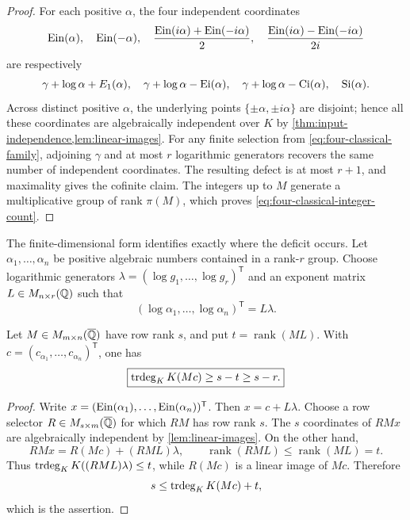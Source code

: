 \begin{proof}
For each positive \(\alpha\), the four independent coordinates
\[
 \operatorname{Ein}(\alpha),\quad \operatorname{Ein}(-\alpha),\quad
 \frac{\operatorname{Ein}(i\alpha)+\operatorname{Ein}(-i\alpha)}2,\quad
 \frac{\operatorname{Ein}(i\alpha)-\operatorname{Ein}(-i\alpha)}{2i}
\]
are respectively
\[
 \gamma+\log\alpha+E_1(\alpha),\quad
 \gamma+\log\alpha-\operatorname{Ei}(\alpha),\quad
 \gamma+\log\alpha-\operatorname{Ci}(\alpha),\quad
 \operatorname{Si}(\alpha).
\]
Across distinct positive \(\alpha\), the underlying points
\(\{\pm\alpha,\pm i\alpha\}\) are disjoint; hence all these coordinates
are algebraically independent over \(K\) by
\cref{thm:input-independence,lem:linear-images}.  For any finite selection
from \eqref{eq:four-classical-family}, adjoining \(\gamma\) and at most
\(r\) logarithmic generators recovers the same number of independent
coordinates.  The resulting defect is at most \(r+1\), and maximality gives
the cofinite claim.  The integers up to \(M\) generate a multiplicative
group of rank \(\pi(M)\), which proves
\eqref{eq:four-classical-integer-count}.
\end{proof}

The finite-dimensional form identifies exactly where the deficit occurs.
Let \(\alpha_1,\ldots,\alpha_n\) be positive algebraic numbers contained in
a rank-\(r\) group.  Choose logarithmic generators
\(\lambda=(\log g_1,\ldots,\log g_r)^{\mathsf T}\) and an exponent matrix
\(L\in M_{n\times r}(\mathbb Q)\) such that
\begin{equation}\label{eq:log-exponent-matrix}
 (\log\alpha_1,\ldots,\log\alpha_n)^{\mathsf T}=L\lambda.
\end{equation}

\begin{theorem}
\label{thm:linear-rank-deficit}
Let \(M\in M_{m\times n}(\overline{\mathbb Q})\) have row rank \(s\), and put
\(t=\operatorname{rank}(ML)\).  With
\(c=(c_{\alpha_1},\ldots,c_{\alpha_n})^{\mathsf T}\), one has
\begin{equation}\label{eq:linear-rank-deficit}
 \boxed{\displaystyle
 \operatorname{trdeg}_KK(Mc)\ge s-t\ge s-r.}
\end{equation}
\end{theorem}

\begin{proof}
Write \(x=(\operatorname{Ein}(\alpha_1),\ldots,\operatorname{Ein}(\alpha_n))^{\mathsf T}\).  Then
\(x=c+L\lambda\).  Choose a row selector
\(R\in M_{s\times m}(\overline{\mathbb Q})\) for which \(RM\) has row rank \(s\).
The \(s\) coordinates of \(RMx\) are algebraically independent by
\cref{lem:linear-images}.  On the other hand,
\[
 RMx=R(Mc)+(RML)\lambda,
 \qquad \operatorname{rank}(RML)\le\operatorname{rank}(ML)=t.
\]
Thus \(\operatorname{trdeg}_KK((RML)\lambda)\le t\), while \(R(Mc)\) is a linear image
of \(Mc\).  Therefore
\[
 s\le \operatorname{trdeg}_KK(Mc)+t,
\]
which is the assertion.
\end{proof}


